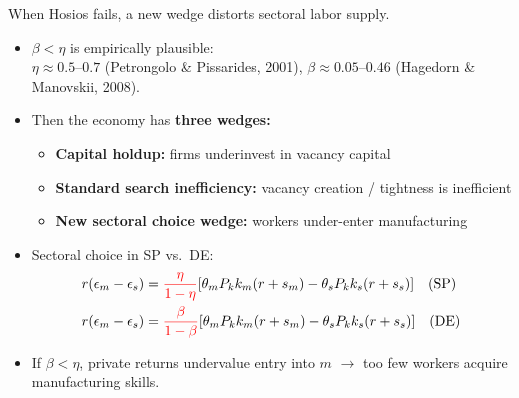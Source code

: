 \documentclass[9pt,xcolor={svgnames}]{beamer}
\begin{document}
\begin{frame}{When Hosios fails, a new wedge distorts sectoral labor supply.}\label{main:beta_eta}

\begin{itemize}

\item $\beta< \eta$ is empirically plausible:\\
{\footnotesize $\eta \approx 0.5$--$0.7$ (Petrongolo \& Pissarides, 2001), \;
$\beta \approx 0.05$--$0.46$ (Hagedorn \& Manovskii, 2008).}
\hyperlink{app:beta_eta}{}

\vspace{3mm}

\item Then the economy has \textbf{three wedges:}
\begin{itemize}
    \item \textbf{Capital holdup:} firms underinvest in vacancy capital
    \item \textbf{Standard search inefficiency:} vacancy creation / tightness is inefficient
    \item \textbf{New sectoral choice wedge:} workers under-enter manufacturing
\end{itemize}

\vspace{3mm}

\item Sectoral choice in SP vs.\ DE:
\begin{align*}
r(\epsilon_m-\epsilon_s) &= \textcolor{red}{\frac{\eta}{1-\eta}}
[\theta_mP_kk_m(r+s_m)-\theta_sP_kk_s(r+s_s)] \quad (\text{SP}) \\
r(\epsilon_m-\epsilon_s) &= \textcolor{red}{\frac{\beta}{1-\beta}}
[\theta_mP_kk_m(r+s_m)-\theta_sP_kk_s(r+s_s)] \quad (\text{DE})
\end{align*}

\item If $\beta<\eta$, private returns undervalue entry into $m$
$\rightarrow$ too few workers acquire manufacturing skills.

\end{itemize}

\end{frame}
\end{document}
